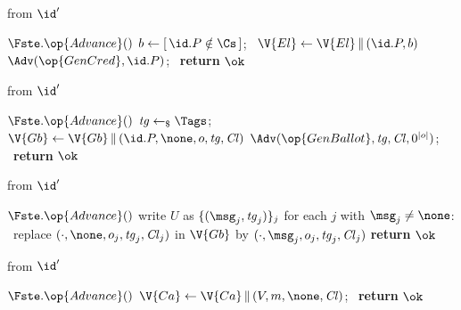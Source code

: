 \begin{interface}
{ \quad from $\id'$
\begin{algorithmic}[1]
\algcont
\State $\Fste.\op{Advance}()$
 \label{ln:votecredonce}
\State $b \gets [\, \id.P \notin \Cs \,]$; \ $\V{El} \gets \V{El} \, \| \, (\id.P, b)$ \label{ln:voteready}
\State $\Adv(\op{GenCred}, \id.P)$; \ \textbf{return} $\ok$ \label{ln:votewhovoted}
\algsave
\end{algorithmic}
\vspace{1.4ex}

 \quad from $\id'$
\begin{algorithmic}[1]
\algcont
\State $\Fste.\op{Advance}()$
 \label{ln:votecastguard}
 \label{ln:voteonevote}
\State $\mathit{tg} \gets_{\$} \Tags$; \ $\V{Gb} \gets \V{Gb} \, \| \, (\id.P, \none, o, \mathit{tg}, \mathit{Cl})$ \label{ln:votenoballotyet}
\State $\Adv(\op{GenBallot}, \mathit{tg}, \mathit{Cl}, 0^{|o|})$; \ \textbf{return} $\ok$ \label{ln:voteleaklength}
\algsave
\end{algorithmic}
\vspace{1.4ex}

 \quad from $\id'$
\begin{algorithmic}[1]
\algcont
\State $\Fste.\op{Advance}()$
\State write $U$ as $\{(\msg_j, \mathit{tg}_j)\}_j$
 \label{ln:votedistinct}
\State for each $j$ with $\msg_j \neq \none$: \ replace $(\cdot, \none, o_j, \mathit{tg}_j, \mathit{Cl}_j)$ in $\V{Gb}$ by $(\cdot, \msg_j, o_j, \mathit{tg}_j, \mathit{Cl}_j)$ \label{ln:voteciphertext}
\State \textbf{return} $\ok$
\algsave
\end{algorithmic}
\vspace{1.4ex}

 \quad from $\id'$
\begin{algorithmic}[1]
\algcont
\State $\Fste.\op{Advance}()$
 \label{ln:votecorrupteligible}
\State $\V{Ca} \gets \V{Ca} \, \| \, (V, m, \none, \mathit{Cl})$; \ \textbf{return} $\ok$ \label{ln:votenoo}
\algsave
\end{algorithmic}
\vspace{1.4ex}

}
\end{interface}
